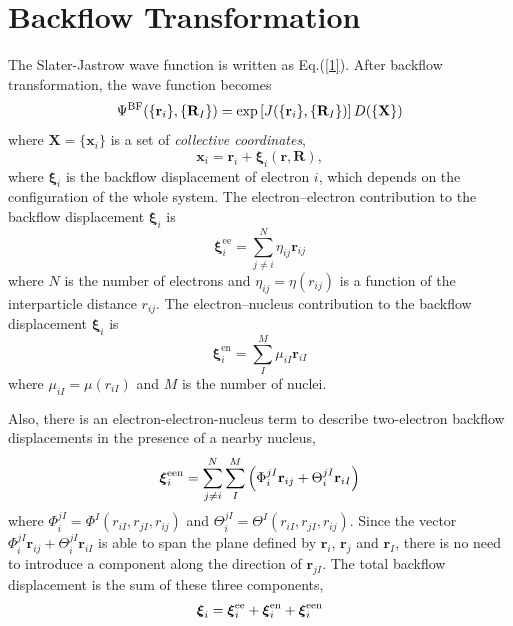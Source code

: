 \documentclass[12pt]{article}
\begin{document}
\section{\large Backflow Transformation}

The Slater-Jastrow wave function is written as Eq.(\ref{1}). After backflow 
transformation, the wave function becomes
\begin{equation}
    \Psi^{\rm BF}(\{\mathbf{r}_i\},\{\mathbf{R}_I\})=\exp\left[J(\{\mathbf{r}_i\},
    \{\mathbf{R}_I\})\right]D(\{\mathbf{X}\})
\end{equation}
where $\mathbf{X}=\{\mathbf{x}_{i}\}$ is a set of \emph{collective coordinates},
\begin{equation}
    \mathbf{x}_{i}=\mathbf{r}_i+\boldsymbol{\xi}_{i}(\mathbf{r},\mathbf{R}),
\end{equation}
where $\boldsymbol{\xi}_{i}$ is the backflow displacement of electron $i$, which depends on 
the configuration of the whole system. The electron–electron contribution to the 
backflow displacement $\boldsymbol{\xi}_{i}$ is 
\begin{equation}
    \boldsymbol{\xi}_{i}^{\mathrm{ee}}=\sum_{j\neq i}^N\eta_{ij}\mathbf{r}_{ij}
\end{equation}
where $N$ is the number of electrons and $\eta_{ij}= \eta(r_{ij})$ is a function of the 
interparticle distance $r_{ij}$. The electron–nucleus contribution to the 
backflow displacement $\boldsymbol{\xi}_{i}$ is
\begin{equation}
    \boldsymbol{\xi}_{i}^{\mathrm{en}}=\sum_{I}^M\mu_{iI}\mathbf{r}_{iI}
\end{equation}
where $\mu_{iI}=\mu(r_{iI})$ and $M$ is the number of nuclei. 

Also, there is an electron-electron-nucleus term to describe two-electron backflow 
displacements in the presence of a nearby nucleus,
\begin{equation}
    \boldsymbol{\xi}_{i}^{\rm een}=\sum_{j\neq i}^N\sum_{I}^M\left(\Phi_i^{jI}
    \mathbf{r}_{ij}+\Theta_i^{jI}\mathbf{r}_{iI}\right)
\end{equation}
where $\Phi^{jI}_i=\Phi^I(r_{iI},r_{jI},r_{ij})$ and $\Theta^{jI}_i=\Theta^I(r_{iI},r_{jI},r_{ij})$. 
Since the vector $\Phi_i^{jI}\mathbf{r}_{ij}+\Theta_i^{jI}\mathbf{r}_{iI}$ is 
able to span the plane defined by $\mathbf{r}_i$, $\mathbf{r}_j$ and $\mathbf{r}_I$, 
there is no need to introduce a component along the direction of $\mathbf{r}_{jI}$. 
The total backflow displacement is the sum of these three components,
\begin{equation}
    \boldsymbol{\xi}_{i}=\boldsymbol{\xi}_{i}^{\rm ee}+\boldsymbol{\xi}_{i}^{\rm en}
    +\boldsymbol{\xi}_{i}^{\rm een}
\end{equation}
\end{document}
